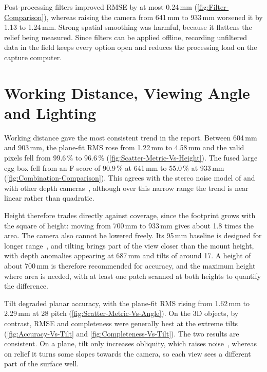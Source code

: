 Post-processing filters improved RMSE by at most 0.24\,mm (\autoref{fig:Filter-Comparison}), whereas raising the camera from 641\,mm to 933\,mm worsened it by 1.13 to 1.24\,mm. Strong spatial smoothing was harmful, because it flattens the relief being measured. Since filters can be applied offline, recording unfiltered data in the field keeps every option open and reduces the processing load on the capture computer.

\section{Working Distance, Viewing Angle and Lighting}

Working distance gave the most consistent trend in the report. Between 604\,mm and 903\,mm, the plane-fit RMS rose from 1.22\,mm to 4.58\,mm and the valid pixels fell from 99.6\,\% to 96.6\,\% (\autoref{fig:Scatter-Metric-Vs-Height}). The fused large egg box fell from an F-score of 90.9\,\% at 641\,mm to 55.0\,\% at 933\,mm (\autoref{fig:Combination-Comparison}). This agrees with the stereo noise model of \citet{keselmanIntelRRealSenseTMStereoscopic2017} and with other depth cameras~\cite{mankoffKinectLowcostHighresolution2013,nguyenModelingKinectSensor2012}, although over this narrow range the trend is near linear rather than quadratic.

Height therefore trades directly against coverage, since the footprint grows with the square of height: moving from 700\,mm to 933\,mm gives about 1.8 times the area. The camera also cannot be lowered freely. Its 95\,mm baseline is designed for longer range~\cite{intel_d456,rustlerEmpiricalComparisonFour2025}, and tilting brings part of the view closer than the mount height, with depth anomalies appearing at 687\,mm and tilts of around 17\textdegree. A height of about 700\,mm is therefore recommended for accuracy, and the maximum height where area is needed, with at least one patch scanned at both heights to quantify the difference.

Tilt degraded planar accuracy, with the plane-fit RMS rising from 1.62\,mm to 2.29\,mm at 28\textdegree{} pitch (\autoref{fig:Scatter-Metric-Vs-Angle}). On the 3D objects, by contrast, RMSE and completeness were generally best at the extreme tilts (\autoref{fig:Accuracy-Vs-Tilt} and \autoref{fig:Completeness-Vs-Tilt}). The two results are consistent. On a plane, tilt only increases obliquity, which raises noise~\cite{nguyenModelingKinectSensor2012}, whereas on relief it turns some slopes towards the camera, so each view sees a different part of the surface well.

